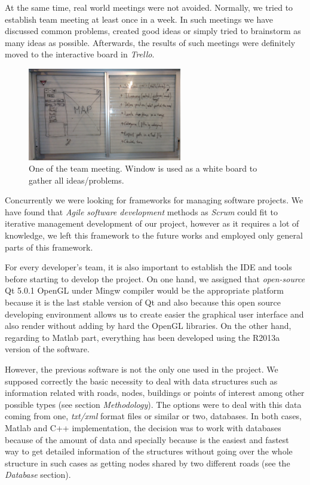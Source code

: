 \documentclass{article}
\begin{document}
At the same time, real world meetings were not avoided. Normally, we tried to establish team meeting at least once in a week. In such meetings we have discussed common problems, created good ideas or simply tried to brainstorm as many ideas as possible. Afterwards, the results of such meetings were definitely moved to the interactive board in \textit{Trello}.

\begin{figure}[!h]
\centering
\includegraphics[width=0.6\textwidth]{windowBoard.jpg}
\caption{One of the team meeting. Window is used as a white board to gather all ideas/problems.}
\end{figure}

Concurrently we were looking for frameworks for managing software projects. We have found that \textit{Agile software development} methods as \textit{Scrum} could fit to iterative management development of our project, however as it requires a lot of knowledge, we left this framework to the future works and employed only general parts of this framework.

For every developer's team, it is also important to establish the IDE and tools before starting to develop the project. On one hand, we assigned that \textit{open-source} Qt 5.0.1 OpenGL under Mingw compiler would be the appropriate platform because it is the last stable version of Qt and also because this open source developing environment allows us to create easier the graphical user interface and also render without adding by hard the OpenGL libraries. On the other hand, regarding to Matlab part, everything has been developed using the R2013a version of the software.

However, the previous software is not the only one used in the project. We supposed correctly the basic necessity to deal with data structures such as information related with roads, nodes, buildings or points of interest among other possible types (see section \textit{Methodology}). The options were to deal with this data coming from one, \textit{txt/xml} format files or similar or two, databases.
In both cases, Matlab and C++ implementation, the decision was to work with databases because of the amount of data and specially because is the easiest and fastest way to get detailed information of the structures without going over the whole structure in such cases as getting nodes shared by two different roads (see the \textit{Database} section).
\end{document}
